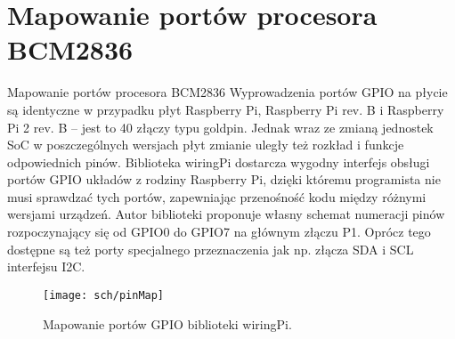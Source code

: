 \chapter{Mapowanie portów procesora BCM2836} %

\label{ch:BCM2836} %

Mapowanie portów procesora BCM2836 
Wyprowadzenia portów GPIO na płycie są identyczne w przypadku płyt Raspberry Pi, Raspberry Pi rev. B i Raspberry Pi 2 rev. B – jest to 40 złączy typu goldpin. Jednak wraz ze zmianą jednostek SoC w poszczególnych wersjach płyt zmianie uległy też rozkład i funkcje odpowiednich pinów.
Biblioteka wiringPi dostarcza wygodny interfejs obsługi portów GPIO układów z rodziny Raspberry Pi, dzięki któremu programista nie musi sprawdzać tych portów, zapewniając przenośność kodu między różnymi wersjami urządzeń.
 Autor biblioteki proponuje własny schemat numeracji pinów rozpoczynający się od GPIO0 do GPIO7 na głównym złączu P1. Oprócz tego dostępne są też porty specjalnego przeznaczenia jak np. złącza SDA i SCL interfejsu I2C.

\begin{figure}[bth]
\centering
{\texttt{[image: sch/pinMap]}}
\caption[Mapowanie portów GPIO biblioteki wiringPi.]{Mapowanie portów GPIO biblioteki wiringPi.}
\label{fig:detObj}
\end{figure} 